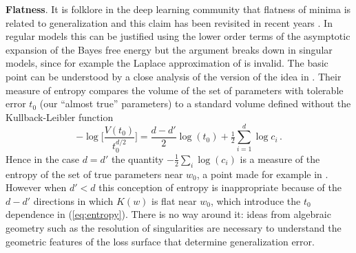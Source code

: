 \documentclass{article} %
\begin{document}
\textbf{Flatness}. It is folklore in the deep learning community that flatness of minima is related to generalization \citep{hinton_keeping_1993, hochreiter1997flat} and this claim has been revisited in recent years \citep{chaudhari2019entropy, smith2017bayesian, jastrzkebski2017three, Zhang:2018MolPh.116.3214Z}. In regular models this can be justified using the lower order terms of the asymptotic expansion of the Bayes free energy \citep[\S 3.1]{Balasubramanian:1996cond.mat..1030B} but the argument breaks down in singular models, since for example the Laplace approximation of \cite{Zhang:2018MolPh.116.3214Z} is invalid. The basic point can be understood by a close analysis of the version of the idea in \citep{hochreiter1997flat}. Their measure of entropy compares the volume of the set of parameters with tolerable error $t_0$ (our ``almost true'' parameters) to a standard volume defined without the Kullback-Leibler function
\begin{equation}\label{eq:entropy}
- \log\Big[\frac{V(t_0)}{t_0^{d/2}}\Big] = \frac{d-d'}{2} \log(t_0) + \tfrac{1}{2} \sum_{i=1}^{d} \log c_i\,.
\end{equation}
Hence in the case $d = d'$ the quantity $-\tfrac{1}{2} \sum_i \log(c_i)$ is a measure of the entropy of the set of true parameters near $w_0$, a point made for example in \cite{Zhang:2018MolPh.116.3214Z}. However when $d' < d$ this conception of entropy is inappropriate because of the $d - d'$ directions in which $K(w)$ is flat near $w_0$, which introduce the $t_0$ dependence in (\ref{eq:entropy}). There is no way around it: ideas from algebraic geometry such as the resolution of singularities are necessary to understand the geometric features of the loss surface that determine generalization error.

\end{document}

